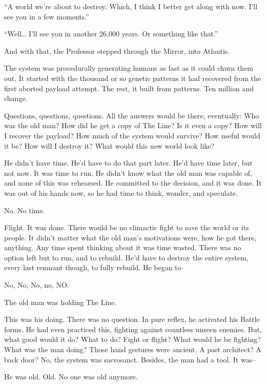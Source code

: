 “A world we’re about to destroy. Which, I think I better get along with now. I’ll see you in a few moments.”

“Well… I’ll see you in another 26,000 years. Or something like that.”

And with that, the Professor stepped through the Mirror, into Atlantis.


The system was procedurally generating humans as fast as it could churn them out. It started with the thousand or so genetic patterns it had recovered from the first aborted payload attempt. The rest, it built from patterns. Ten million and change.

Questions, questions, questions. All the answers would be there, eventually: Who was the old man? How did he get a copy of The Line? Is it even a copy? How will I recover the payload? How much of the system would survive? How useful would it be? How will I destroy it? What would this new world look like?

He didn’t have time. He’d have to do that part later. He’d have time later, but not now. It was time to run. He didn’t know what the old man was capable of, and none of this was rehearsed. He committed to the decision, and it was done. It was out of his hands now, so he had time to think, wonder, and speculate.

No. No time.

Flight. It was done. There would be no climactic fight to save the world or its people.  It didn’t matter what the old man’s motivations were, how he got there, anything.  Any time spent thinking about it was time wasted. There was no option left but to run, and to rebuild. He’d have to destroy the entire system, every last remnant though, to fully rebuild. He began to–

No, No, No, no, NO.

The old man was holding The Line.

This was his doing. There was no question. In pure reflex, he activated his Battle forms. He had even practiced this, fighting against countless unseen enemies. But, what good would it do? What to do? Fight or flight? What would he be fighting? What was the man doing? Those hand gestures were ancient. A past architect? A back door? No, the system was sacrosanct. Besides, the man had a tool. It was–

He was old. Old. No one was old anymore.

